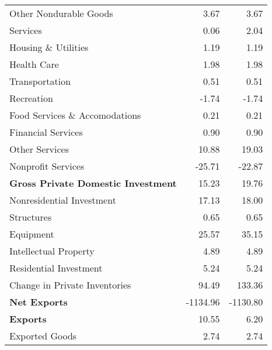 \documentclass[11pt, letterpaper]{article}\usepackage[]{graphicx}\usepackage[]{color}
\begin{document}
\begin{table}[H]
\begin{tabular}{lrr}
  \hspace{24mm}  Other Nondurable Goods & 3.67 & 3.67 \\ 
  \hspace{8mm}  Services & 0.06 & 2.04 \\ 
  \hspace{16mm}  Housing \& Utilities & 1.19 & 1.19 \\ 
  \hspace{16mm}  Health Care & 1.98 & 1.98 \\ 
  \hspace{16mm}  Transportation & 0.51 & 0.51 \\ 
  \hspace{16mm}  Recreation & -1.74 & -1.74 \\ 
  \hspace{16mm}  Food Services \& Accomodations & 0.21 & 0.21 \\ 
  \hspace{16mm}  Financial Services & 0.90 & 0.90 \\ 
  \hspace{16mm}  Other Services & 10.88 & 19.03 \\ 
  \hspace{16mm}  Nonprofit Services & -25.71 & -22.87 \\ 
  \hspace{0mm} \textbf{Gross Private Domestic Investment} & 15.23 & 19.76 \\ 
  \hspace{8mm}  Nonresidential Investment & 17.13 & 18.00 \\ 
  \hspace{16mm}  Structures & 0.65 & 0.65 \\ 
  \hspace{16mm}  Equipment & 25.57 & 35.15 \\ 
  \hspace{16mm}  Intellectual Property & 4.89 & 4.89 \\ 
  \hspace{8mm}  Residential Investment & 5.24 & 5.24 \\ 
  \hspace{8mm}  Change in Private Inventories & 94.49 & 133.36 \\ 
  \hspace{0mm} \textbf{Net Exports} & -1134.96 & -1130.80 \\ 
  \hspace{0mm} \textbf{Exports} & 10.55 & 6.20 \\ 
  \hspace{8mm}  Exported Goods & 2.74 & 2.74 \\ 

\end{tabular}
\end{table}
\end{document}
